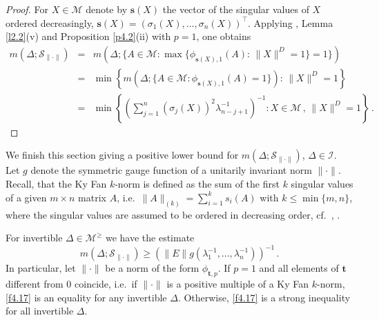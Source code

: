 \documentclass{amsart}
\begin{document}
\begin{proof}
For $X \in {\mathcal M}$ denote by ${\mathbf s}(X)$ the vector of the singular values of $X$ ordered decreasingly, ${\mathbf s}(X) = (\sigma_1(X),\ldots,\sigma_n(X) )^\top$. Applying \cite[Thm.~3.5.5]{HJ2}, Lemma \ref{l2.2}(v) and Proposition \ref{p4.2}(ii) with $p=1$, one obtains 
\begin{eqnarray*}
m(\Delta ;  {\mathcal S}_{\| \cdot \|}) & = &  m(\Delta ; \{ A \in {\mathcal M} : \max \{ \phi_{{\mathbf s}(X), 1}(A) :   \,\| X \|^D=1 \} = 1 \}) \\
          & = & \min \left\{ m(\Delta; \{ A \in {\mathcal M} : {\phi}_{{{\mathbf s}(X)},1} (A)=1 \}) : \,\| X \|^D=1 \right\} \\
          & = & \min \left\{ \left( \sum_{j=1}^n (\sigma_j(X))^2 \lambda_{n-j+1}^{-1} \right)^{-1} :  X \in {\mathcal M} \, , \,\| X \|^D=1 \right\} \, . 
\end{eqnarray*}         
\end{proof}    

We finish this section giving a positive lower bound for $m(\Delta ; {\mathcal S}_{\| \cdot \|})$, $\Delta \in \mathcal I$. Let $g$ denote the symmetric gauge function of a unitarily invariant norm $\| \cdot \|$. Recall, that the Ky Fan $k$-norm is defined as the sum of the first $k$ singular values of a given $m \times n$ matrix $A$, i.e.~$\|A\|_{(k)} = \sum_{i=1}^k s_i(A)$ with $k \leq \min \{ m,n\}$, where the singular values are assumed to be ordered in decreasing order, cf.~\cite[p.~92]{Bh}, \cite{Fan,Watson,Ding}.

\begin{pro} \label{p4.9}
     For invertible $\Delta \in \mathcal M^\geq$ we have the estimate
     \begin{equation}  \label{f4.17}
          m(\Delta ; {\mathcal S}_{\| \cdot \|} ) \geq ( \| E \| g(\lambda_1^{-1},\ldots,\lambda_n^{-1}))^{-1} \, .
     \end{equation}     
     In particular, let $\| \cdot \|$ be a norm of the form $\phi_{{\mathbf t},p}$. If $p=1$ and all elements of $\mathbf t$ different from $0$ coincide, i.e.~if $\| \cdot \|$ is a positive multiple of a Ky Fan $k$-norm, \eqref{f4.17} is an equality for any invertible $\Delta$. Otherwise, \eqref{f4.17} is a strong inequality for all invertible $\Delta$.
\end{pro}
\end{document}
